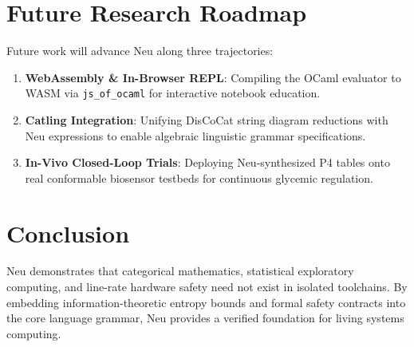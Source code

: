\documentclass[11pt]{article}
\begin{document}
\section{Future Research Roadmap}

Future work will advance Neu along three trajectories:
\begin{enumerate}
    \item \textbf{WebAssembly \& In-Browser REPL}: Compiling the OCaml evaluator to WASM via \texttt{js\_of\_ocaml} for interactive notebook education.
    \item \textbf{Catling Integration}: Unifying DisCoCat string diagram reductions with Neu expressions to enable algebraic linguistic grammar specifications.
    \item \textbf{In-Vivo Closed-Loop Trials}: Deploying Neu-synthesized P4 tables onto real conformable biosensor testbeds for continuous glycemic regulation.
\end{enumerate}

\section{Conclusion}
Neu demonstrates that categorical mathematics, statistical exploratory computing, and line-rate hardware safety need not exist in isolated toolchains. By embedding information-theoretic entropy bounds and formal safety contracts into the core language grammar, Neu provides a verified foundation for living systems computing.
\end{document}

